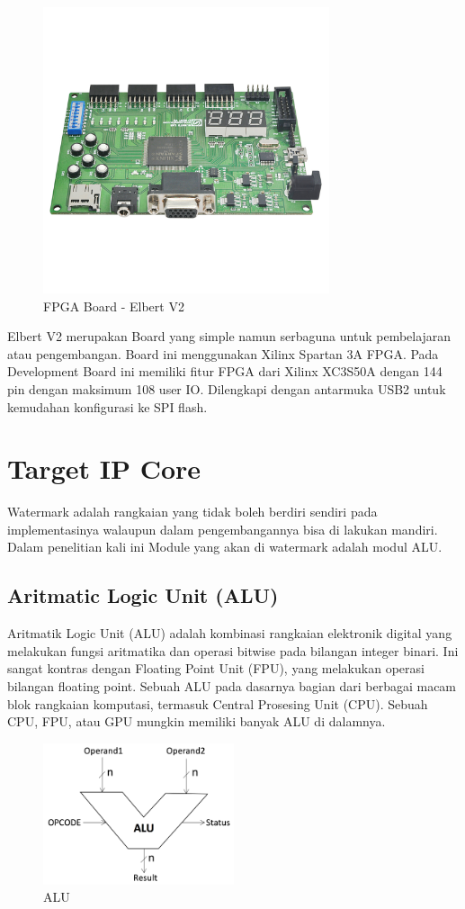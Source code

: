 \begin{figure}
	\centering
	\includegraphics[width=0.75\textwidth]
	{pics/elbertv2.jpg}
	\caption{FPGA Board - Elbert V2}
	\label{fig:fpga}
\end{figure}

Elbert V2 merupakan Board yang simple namun serbaguna untuk pembelajaran atau pengembangan. Board ini menggunakan Xilinx Spartan 3A FPGA. Pada Development Board ini memiliki fitur FPGA dari Xilinx XC3S50A dengan 144 pin dengan maksimum 108 user IO. Dilengkapi dengan antarmuka USB2 untuk kemudahan konfigurasi ke SPI flash. 

\section{Target IP Core}
Watermark adalah rangkaian yang tidak boleh berdiri sendiri pada implementasinya walaupun dalam pengembangannya bisa di lakukan mandiri. Dalam penelitian kali ini Module yang akan di watermark adalah modul ALU.

\subsection{Aritmatic Logic Unit (ALU)}
Aritmatik Logic Unit (ALU) adalah kombinasi rangkaian elektronik digital yang melakukan fungsi aritmatika dan operasi bitwise pada bilangan integer binari. Ini sangat kontras dengan Floating Point Unit (FPU), yang melakukan operasi bilangan floating point. Sebuah ALU pada dasarnya bagian dari berbagai macam blok rangkaian komputasi, termasuk Central Prosesing Unit (CPU). Sebuah CPU, FPU, atau GPU mungkin memiliki banyak ALU di dalamnya.

\begin{figure}
	\centering
	\includegraphics[width=0.5\textwidth]
	{pics/alu.png}
	\caption{ALU}
	\label{alu}
\end{figure}

